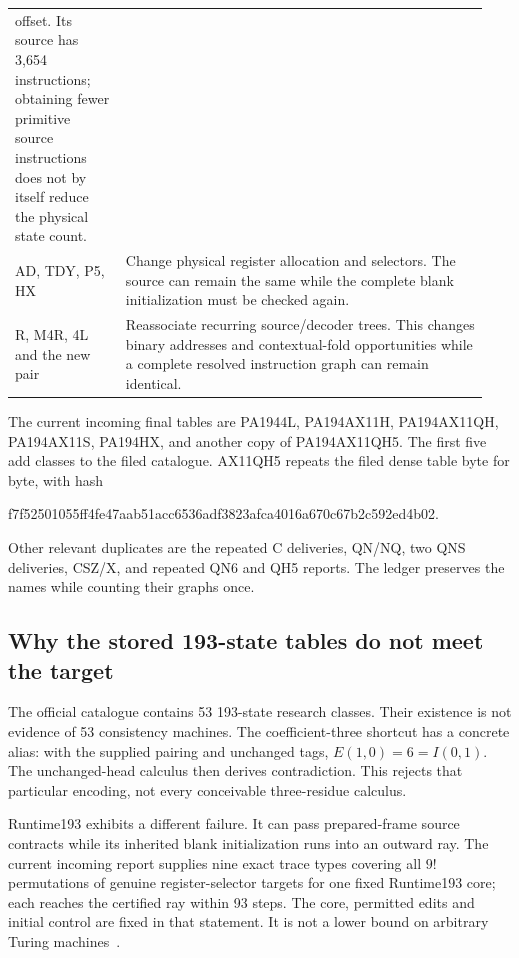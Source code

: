 \documentclass[10pt,letterpaper]{article}
\begin{document}
\begin{longtable}{@{}p{0.22\linewidth}p{0.72\linewidth}@{}}
offset. Its source has 3,654 instructions; obtaining fewer primitive source
instructions does not by itself reduce the physical state count.\\[4pt]
AD, TDY, P5, HX & Change physical register allocation and selectors.
The source can remain the same while the complete blank initialization
must be checked again.\\[4pt]
R, M4R, 4L and the new pair & Reassociate recurring source/decoder trees.
This changes binary addresses and contextual-fold opportunities while a
complete resolved instruction graph can remain identical.\\
\bottomrule
\end{longtable}

The current incoming final tables are PA1944L, PA194AX11H, PA194AX11QH,
PA194AX11S, PA194HX, and another copy of PA194AX11QH5. The first five add
classes to the filed catalogue. AX11QH5 repeats the filed dense table
byte for byte, with hash
\begin{center}\footnotesize\ttfamily
f7f52501055ff4fe47aab51acc6536adf3823afca4016a670c67b2c592ed4b02.
\end{center}
Other relevant duplicates are the repeated C deliveries, QN/NQ, two QNS
deliveries, CSZ/X, and repeated QN6 and QH5 reports. The ledger preserves the
names while counting their graphs once.

\subsection{Why the stored 193-state tables do not meet the target}

The official catalogue contains 53 193-state research classes. Their
existence is not evidence of 53 consistency machines. The coefficient-three
shortcut has a concrete alias: with the supplied pairing and unchanged
tags, $E(1,0)=6=I(0,1)$. The unchanged-head calculus then derives
contradiction. This rejects that particular encoding, not every conceivable
three-residue calculus.

Runtime193 exhibits a different failure. It can pass prepared-frame source
contracts while its inherited blank initialization runs into an outward
ray. The current incoming report supplies nine exact trace types covering
all $9!$ permutations of genuine register-selector targets for one fixed
Runtime193 core; each reaches the certified ray within 93 steps. The core,
permitted edits and initial control are fixed in that statement. It is not
a lower bound on arbitrary Turing machines~\cite{latest-packet}.
\end{document}
